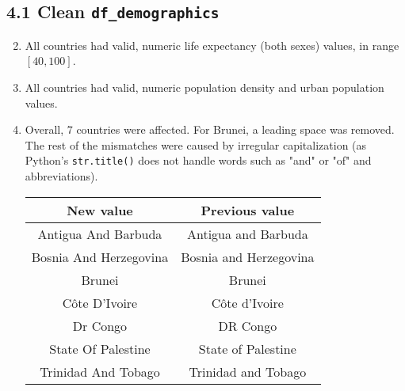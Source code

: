 \documentclass[14pt]{extarticle}
\begin{document}
\subsection*{4.1 Clean \texttt{df\_demographics}}
\begin{enumerate}[label=(\alph*)]
  \setcounter{enumi}{1}
  \item All countries had valid, numeric life expectancy (both sexes) values, in range $[40,100]$.
  \item All countries had valid, numeric population density and urban population values.
  \setcounter{enumi}{5}
  \item Overall, 7 countries were affected. For Brunei, a leading space was removed.
    The rest of the mismatches were caused by irregular capitalization
    (as Python's \texttt{str.title()} does not handle words such as "and" or "of" and abbreviations).
  \begin{center}
    \begin{tabular}{ |c|c| }
      \hline
      New value&Previous value\\
      \hline
      Antigua And Barbuda&Antigua and Barbuda\\
      Bosnia And Herzegovina&Bosnia and Herzegovina\\
      Brunei&Brunei\\
      Côte D'Ivoire&Côte d'Ivoire\\
      Dr Congo&DR Congo\\
      State Of Palestine&State of Palestine\\
      Trinidad And Tobago&Trinidad and Tobago\\
      \hline
    \end{tabular}
  \end{center}
\end{enumerate}
\end{document}
